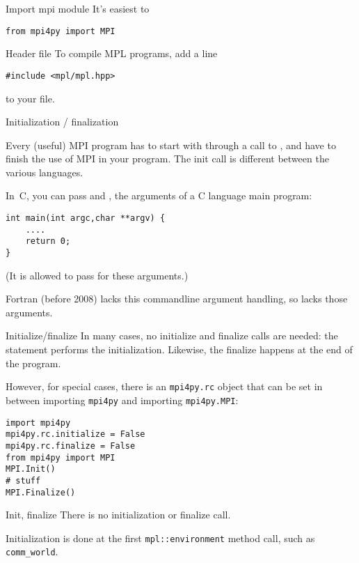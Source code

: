 \begin{pythonnote}{Import mpi module}
  It's easiest to
\begin{lstlisting}
from mpi4py import MPI
\end{lstlisting}
\end{pythonnote}

\begin{mplnote}{Header file}
  To compile MPL programs, add a line
\begin{lstlisting}
#include <mpl/mpl.hpp>
\end{lstlisting}
  to your file.
\end{mplnote}

 {Initialization / finalization}
\label{sec:mpi-init}

Every (useful) MPI program has to start with 
through a call to
, and have
 to finish the use of MPI in your program.
The init call is different between the various languages.

In~C, you can pass  and , the arguments
of a C language main program:
 \begin{lstlisting}
int main(int argc,char **argv) {
    ....
    return 0;
}
\end{lstlisting}
(It is allowed to pass  for these arguments.)

Fortran (before 2008) lacks this commandline argument handling,
so  lacks those arguments.

\begin{pythonnote}{Initialize/finalize}
  In many cases,  no initialize and finalize calls are needed:
  the statement
  performs the initialization.
  Likewise, the finalize happens at the end of the program.

  However, for special cases, there is an \lstinline{mpi4py.rc} object
  that can be set in between importing \lstinline{mpi4py} and
  importing \lstinline{mpi4py.MPI}:
\begin{lstlisting}
import mpi4py
mpi4py.rc.initialize = False
mpi4py.rc.finalize = False
from mpi4py import MPI
MPI.Init()
# stuff
MPI.Finalize()
\end{lstlisting}
\end{pythonnote}

\begin{mplnote}{Init, finalize}
  There is no initialization or finalize call.
  \begin{mplimpl}
    Initialization is done at the first \lstinline+mpl::environment+ method call,
    such as \lstinline+comm_world+.
  \end{mplimpl}

\end{mplnote}

